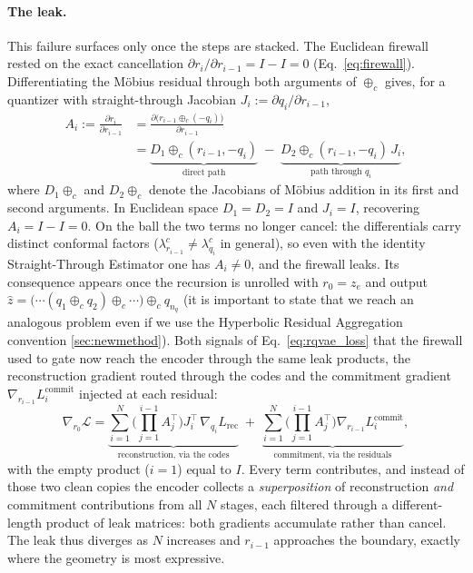 \documentclass[12pt]{report}
\begin{document}
\paragraph{The leak.}
This failure surfaces only once the steps are stacked. The Euclidean firewall rested on the exact cancellation $\partial r_i/\partial r_{i-1}=I-I=0$ (Eq.~\ref{eq:firewall}). Differentiating the M\"obius residual through both arguments of $\oplus_c$ gives, for a quantizer with straight-through Jacobian $J_i := \partial q_i/\partial r_{i-1}$,
\begin{equation}
    \label{eq:leak}
    \begin{aligned}
    A_i := \frac{\partial r_i}{\partial r_{i-1}}
    &= \frac{\partial\big(r_{i-1}\oplus_c(-q_i)\big)}{\partial r_{i-1}} \\
    &= \underbrace{D_1\!\oplus_c(r_{i-1}, -q_i)}_{\text{direct path}}
    \;-\; \underbrace{D_2\!\oplus_c(r_{i-1}, -q_i)\, J_i}_{\text{path through }q_i},
    \end{aligned}
\end{equation}
where $D_1\!\oplus_c$ and $D_2\!\oplus_c$ denote the Jacobians of M\"obius addition in its first and second arguments. In Euclidean space $D_1=D_2=I$ and $J_i=I$, recovering $A_i=I-I=0$. On the ball the two terms no longer cancel: the differentials carry distinct conformal factors ($\lambda^c_{r_{i-1}}\neq\lambda^c_{q_i}$ in general), so even with the identity Straight-Through Estimator one has $A_i\neq 0$, and the firewall leaks. Its consequence appears once the recursion is unrolled with $r_0=z_e$ and output $\hat z = \big(\cdots(q_1\oplus_c q_2)\oplus_c\cdots\big)\oplus_c q_{n_q}$ (it is important to state that we reach an analogous problem even if we use the Hyperbolic Residual Aggregation convention \ref{sec:newmethod}). Both signals of Eq.~\ref{eq:rqvae_loss} that the firewall used to gate now reach the encoder through the same leak products, the reconstruction gradient routed through the codes and the commitment gradient $\nabla_{r_{i-1}} L^{\text{commit}}_i$ injected at each residual:
\begin{equation}
    \label{eq:stack}
    \nabla_{r_0}\mathcal{L}
    = \underbrace{\sum_{i=1}^{N}\Big(\textstyle\prod_{j=1}^{i-1} A_j^{\top}\Big)
    J_i^{\top}\,\nabla_{q_i} L_{\text{rec}}}_{\text{reconstruction, via the codes}}
    \;+\; \underbrace{\sum_{i=1}^{N}\Big(\textstyle\prod_{j=1}^{i-1} A_j^{\top}\Big)
    \nabla_{r_{i-1}} L^{\text{commit}}_i}_{\text{commitment, via the residuals}},
\end{equation}
with the empty product ($i=1$) equal to $I$. Every term contributes, and instead of those two clean copies the encoder collects a \emph{superposition} of reconstruction \emph{and} commitment contributions from all $N$ stages, each filtered through a different-length product of leak matrices: both gradients accumulate rather than cancel. The leak thus diverges as $N$ increases and $r_{i-1}$ approaches the boundary, exactly where the geometry is most expressive.
\end{document}
